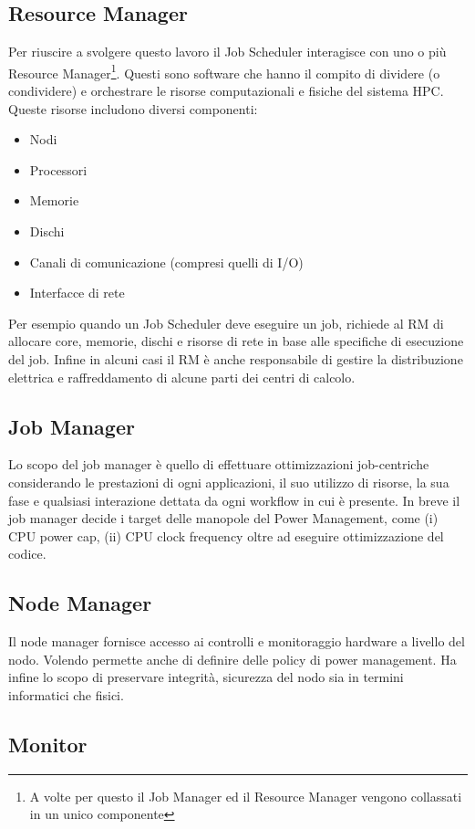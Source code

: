 \subsection{Resource Manager}
Per riuscire a svolgere questo lavoro il Job Scheduler interagisce con uno o più Resource Manager\footnote{A volte per questo il Job Manager ed il Resource Manager vengono collassati in un unico componente}. Questi sono software che hanno il compito di dividere (o condividere) e orchestrare le risorse computazionali e fisiche del sistema HPC. Queste risorse includono diversi componenti:
\begin{itemize}
    \item Nodi
    \item Processori
    \item Memorie
    \item Dischi
    \item Canali di comunicazione (compresi quelli di I/O)
    \item Interfacce di rete 
\end{itemize}
Per esempio quando un Job Scheduler deve eseguire un job, richiede al RM di allocare core, memorie, dischi e risorse di rete in base alle specifiche di esecuzione del job.
Infine in alcuni casi il RM è anche responsabile di gestire la distribuzione elettrica e raffreddamento di alcune parti dei centri di calcolo\cite{ResourceManager}.

\subsection{Job Manager}
Lo scopo del job manager è quello di effettuare ottimizzazioni job-centriche considerando le prestazioni di ogni applicazioni, il suo utilizzo di risorse, la sua fase e qualsiasi interazione dettata da ogni workflow in cui è presente. In breve il job manager decide i target delle manopole del Power Management, come (i) CPU power cap, (ii) CPU clock frequency oltre ad eseguire ottimizzazione del codice.

\subsection{Node Manager}
Il node manager fornisce accesso ai controlli e monitoraggio hardware a livello del nodo. Volendo permette anche di definire delle policy di power management. Ha infine lo scopo di preservare integrità, sicurezza del nodo sia in termini informatici che fisici.

\subsection{Monitor}

